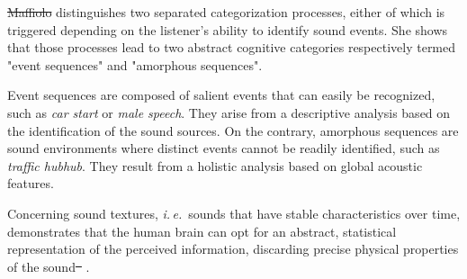 \documentclass[12pt]{elsarticle}
\newcommand{\ie}{\emph{i.\,e.}}
\providecommand{\DIFdel}[1]{{\protect\color{red}\sout{#1}}}                      %
\providecommand{\DIFdelbegin}{} %
\providecommand{\DIFdelend}{} %
\begin{document}
\DIFdelbegin %

\DIFdel{Maffiolo }\DIFdelend \cite{maffiolo_caracterisation_1999} distinguishes two separated categorization processes, either of which is triggered depending on the listener's ability to identify sound events. She shows that those processes lead to two abstract cognitive categories respectively termed "event sequences" and "amorphous sequences". \DIFdelbegin %


\DIFdelend Event sequences are composed of salient events that can easily be recognized, such as \emph{car start} or \emph{male speech}. They arise from a descriptive analysis based on the identification of the sound sources. On the contrary, amorphous sequences are sound environments where distinct events cannot be readily identified, such as \emph{traffic hubhub}. They result from a holistic analysis based on global acoustic features.

\DIFdelbegin %

\DIFdelend Concerning sound textures, \ie~sounds that have stable characteristics over time, \cite{mcdermott2011sound,mcdermott2013summary} demonstrates that the human brain can opt for an abstract, statistical representation of the perceived information, discarding precise physical properties of the sound\DIFdelbegin \DIFdel{\mbox{%
\cite{nelken2013ear}}%
}\DIFdelend .
\end{document}
